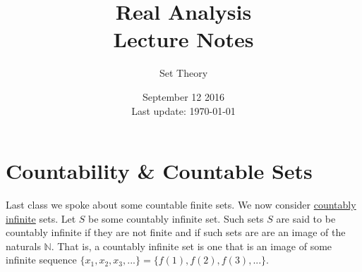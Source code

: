 \documentclass[12pt]{article}
\newlength\tindent
\renewcommand{\indent}{\hspace*{\tindent}}
\newcommand{\N}{\mathbb N}
\begin{document}
 
 
\title{Real Analysis\\Lecture Notes}
\author{Set Theory}
\date{September 12 2016 \\ Last update: \today{}}
\maketitle

\section{Countability \& Countable Sets}

\indent Last class we spoke about some countable finite sets. We now consider \underline{countably infinite} sets. Let $S$ be some countably infinite set. Such sets $S$ are said to be countably infinite if they are not finite and if such sets are are an image of the naturals $\N$. That is, a countably infinite set is one that is an image of some infinite sequence $\{x_1, x_2, x_3, ... \} = \{ f(1), f(2), f(3),  ...\}$. \\
\end{document}
